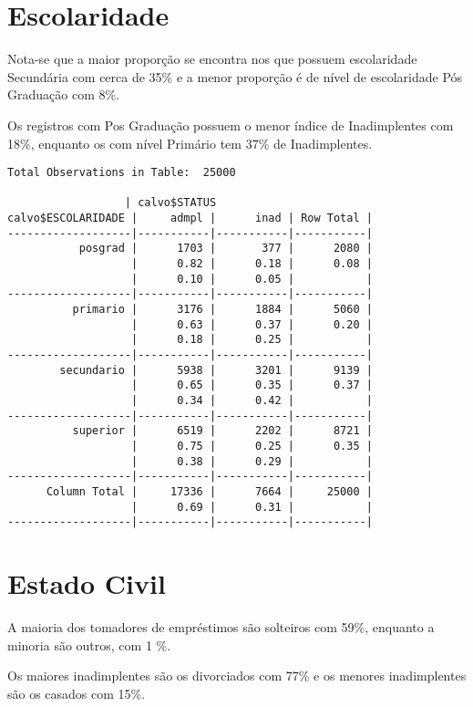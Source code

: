 \section{Escolaridade}

Nota-se que a maior proporção se encontra nos que possuem escolaridade
Secundária com cerca de 35\% e a menor proporção é de nível de escolaridade
Pós Graduação com 8\%.

Os registros com Pos Graduação possuem o menor índice de Inadimplentes
com 18\%, enquanto os com nível Primário tem 37\% de Inadimplentes.

\begin{lstlisting}
Total Observations in Table:  25000 

                  | calvo$STATUS 
calvo$ESCOLARIDADE |     admpl |      inad | Row Total | 
-------------------|-----------|-----------|-----------|
           posgrad |      1703 |       377 |      2080 | 
                   |      0.82 |      0.18 |      0.08 | 
                   |      0.10 |      0.05 |           | 
-------------------|-----------|-----------|-----------|
          primario |      3176 |      1884 |      5060 | 
                   |      0.63 |      0.37 |      0.20 | 
                   |      0.18 |      0.25 |           | 
-------------------|-----------|-----------|-----------|
        secundario |      5938 |      3201 |      9139 | 
                   |      0.65 |      0.35 |      0.37 | 
                   |      0.34 |      0.42 |           | 
-------------------|-----------|-----------|-----------|
          superior |      6519 |      2202 |      8721 | 
                   |      0.75 |      0.25 |      0.35 | 
                   |      0.38 |      0.29 |           | 
-------------------|-----------|-----------|-----------|
      Column Total |     17336 |      7664 |     25000 | 
                   |      0.69 |      0.31 |           | 
-------------------|-----------|-----------|-----------|
\end{lstlisting}



\section{Estado Civil}

A maioria dos tomadores de empréstimos são solteiros com 59\%, enquanto
a minoria são outros, com 1 \%.

Os maiores inadimplentes são os divorciados com 77\% e os menores
inadimplentes são os casados com 15\%.

